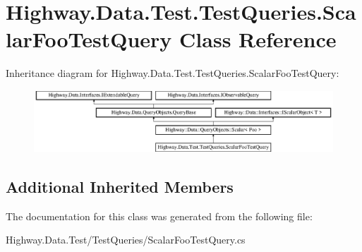 \hypertarget{class_highway_1_1_data_1_1_test_1_1_test_queries_1_1_scalar_foo_test_query}{\section{Highway.\-Data.\-Test.\-Test\-Queries.\-Scalar\-Foo\-Test\-Query Class Reference}
\label{class_highway_1_1_data_1_1_test_1_1_test_queries_1_1_scalar_foo_test_query}
}
Inheritance diagram for Highway.\-Data.\-Test.\-Test\-Queries.\-Scalar\-Foo\-Test\-Query\-:\begin{figure}[H]
\begin{center}
\leavevmode
\includegraphics[height=2.333333cm]{class_highway_1_1_data_1_1_test_1_1_test_queries_1_1_scalar_foo_test_query}
\end{center}
\end{figure}
\subsection*{Additional Inherited Members}


The documentation for this class was generated from the following file\-:\begin{DoxyCompactItemize}
\item 
Highway.\-Data.\-Test/\-Test\-Queries/Scalar\-Foo\-Test\-Query.\-cs\end{DoxyCompactItemize}
